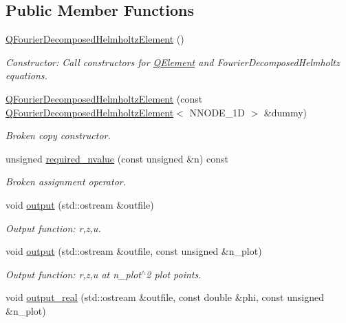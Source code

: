 \subsection*{Public Member Functions}
\begin{DoxyCompactItemize}
\item 
\hyperlink{classoomph_1_1QFourierDecomposedHelmholtzElement_a715abcf373a32565a87d70a09d5ed314}{Q\+Fourier\+Decomposed\+Helmholtz\+Element} ()
\begin{DoxyCompactList}\small\item\em Constructor\+: Call constructors for \hyperlink{classoomph_1_1QElement}{Q\+Element} and Fourier\+Decomposed\+Helmholtz equations. \end{DoxyCompactList}\item 
\hyperlink{classoomph_1_1QFourierDecomposedHelmholtzElement_afd2e6b4d996cfb4f33ac91bcd5e603c3}{Q\+Fourier\+Decomposed\+Helmholtz\+Element} (const \hyperlink{classoomph_1_1QFourierDecomposedHelmholtzElement}{Q\+Fourier\+Decomposed\+Helmholtz\+Element}$<$ N\+N\+O\+D\+E\+\_\+1D $>$ \&dummy)
\begin{DoxyCompactList}\small\item\em Broken copy constructor. \end{DoxyCompactList}\item 
unsigned \hyperlink{classoomph_1_1QFourierDecomposedHelmholtzElement_a9eaf94d6f205d8a38e3e703999524eb1}{required\+\_\+nvalue} (const unsigned \&n) const
\begin{DoxyCompactList}\small\item\em Broken assignment operator. \end{DoxyCompactList}\item 
void \hyperlink{classoomph_1_1QFourierDecomposedHelmholtzElement_a5182e60d2d855fc2724dabae242157aa}{output} (std\+::ostream \&outfile)
\begin{DoxyCompactList}\small\item\em Output function\+: r,z,u. \end{DoxyCompactList}\item 
void \hyperlink{classoomph_1_1QFourierDecomposedHelmholtzElement_aa14e9dc5f9773a5b043ea7873a7b9790}{output} (std\+::ostream \&outfile, const unsigned \&n\+\_\+plot)
\begin{DoxyCompactList}\small\item\em Output function\+: r,z,u at n\+\_\+plot$^\wedge$2 plot points. \end{DoxyCompactList}\item 
void \hyperlink{classoomph_1_1QFourierDecomposedHelmholtzElement_a0feea9801280dce3e0a73bd5d370431f}{output\+\_\+real} (std\+::ostream \&outfile, const double \&phi, const unsigned \&n\+\_\+plot)

\end{DoxyCompactItemize}
